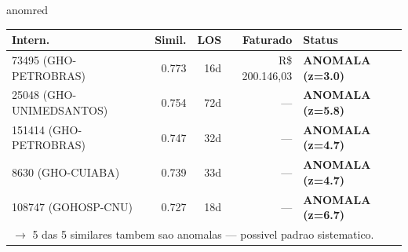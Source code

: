 \documentclass[a4paper,10pt]{article}
\begin{document}
\begin{anomalycard}[Internacao 159824 | GHO-PETROBRAS | CRITICO (z=5.64)]{anomred}
\begin{tabular}{l r r r l}\toprule\textbf{Intern.} & \textbf{Simil.} & \textbf{LOS} & \textbf{Faturado} & \textbf{Status} \\\midrule
73495 (GHO-PETROBRAS) & 0.773 & 16d & R\$ 200.146,03 & \textcolor{anomred}{\textbf{ANOMALA (z=3.0)}} \\
25048 (GHO-UNIMEDSANTOS) & 0.754 & 72d & --- & \textcolor{anomred}{\textbf{ANOMALA (z=5.8)}} \\
151414 (GHO-PETROBRAS) & 0.747 & 32d & --- & \textcolor{anomred}{\textbf{ANOMALA (z=4.7)}} \\
8630 (GHO-CUIABA) & 0.739 & 33d & --- & \textcolor{anomred}{\textbf{ANOMALA (z=4.7)}} \\
108747 (GOHOSP-CNU) & 0.727 & 18d & --- & \textcolor{anomred}{\textbf{ANOMALA (z=6.7)}} \\
\multicolumn{5}{l}{\textcolor{anomred}{\small $\rightarrow$ 5 das 5 similares tambem sao anomalas --- possivel padrao sistematico.}} \\
\bottomrule\end{tabular}



\end{anomalycard}

\newpage
\end{document}
